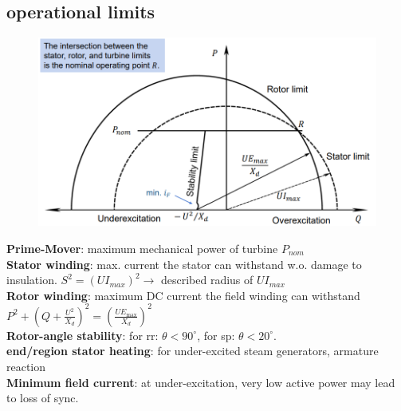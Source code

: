 \documentclass[a4paper,10pt,landscape]{scrartcl}
\begin{document}
\begin{multicols*}{3}
\subsection{operational limits}
\begin{figure}[H]
    \centering
    \includegraphics[width=1\linewidth]{src/capability curve.png}
\end{figure}
\vspace{-.5cm}

\textbf{Prime-Mover}: maximum mechanical power of turbine $P_{nom}$ \\
\textbf{Stator winding}: max. current the stator can withstand w.o. damage to insulation. $S^2=(UI_{max})^2\rightarrow$ described radius of $UI_{max}$\\
\textbf{Rotor winding}: maximum DC current the field winding can withstand $P^2+\left(Q+\frac{U^2}{X_d}\right)^2=\left(\frac{U E_{\max }}{X_d}\right)^2$ \\
\textbf{Rotor-angle stability}: for rr: $\theta<90^\circ$, for sp: $\theta<20^\circ$. \\
\textbf{end/region stator heating}: for under-excited steam generators, armature reaction \\
\textbf{Minimum field current}: at under-excitation, very low active power may lead to loss of sync. \\

\newpage


\end{multicols*}
\end{document}
